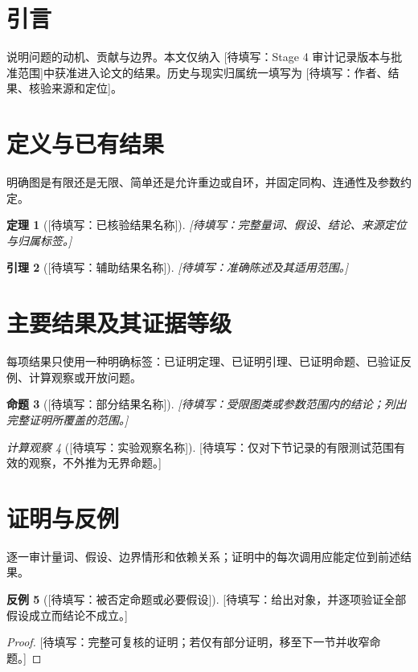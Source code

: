 \documentclass[UTF8,11pt,a4paper,fontset=fandol]{ctexart}
\title{\PaperTitle}
\author{\AuthorNames}
\date{\today}
\newtheorem{theorem}{定理}[section]
\newtheorem{lemma}[theorem]{引理}
\newtheorem{proposition}[theorem]{命题}
\theoremstyle{definition}
\newtheorem{counterexample}[theorem]{反例}
\theoremstyle{remark}
\newtheorem{observation}[theorem]{计算观察}
\newcommand{\Placeholder}[1]{\textcolor{magenta!70!black}{[待填写：#1]}}
\newcommand{\Attribution}[1]{\Placeholder{#1}}
\providecommand{\EvidenceAudit}{\Placeholder{Stage 4 审计记录版本与批准范围}}
\begin{document}
\maketitle
\begin{abstract}
\Placeholder{研究问题、图类、主要结果、证据等级与局限。不得把计算观察写成证明。}
\end{abstract}
\tableofcontents

\section{引言}
说明问题的动机、贡献与边界。本文仅纳入 \EvidenceAudit 中获准进入论文的结果。历史与现实归属统一填写为 \Attribution{作者、结果、核验来源和定位}。

\section{定义与已有结果}
明确图是有限还是无限、简单还是允许重边或自环，并固定同构、连通性及参数约定。
\begin{theorem}[\Placeholder{已核验结果名称}]
\Placeholder{完整量词、假设、结论、来源定位与归属标签。}
\end{theorem}
\begin{lemma}[\Placeholder{辅助结果名称}]
\Placeholder{准确陈述及其适用范围。}
\end{lemma}

\section{主要结果及其证据等级}
每项结果只使用一种明确标签：已证明定理、已证明引理、已证明命题、已验证反例、计算观察或开放问题。
\begin{proposition}[\Placeholder{部分结果名称}]
\Placeholder{受限图类或参数范围内的结论；列出完整证明所覆盖的范围。}
\end{proposition}
\begin{observation}[\Placeholder{实验观察名称}]
\Placeholder{仅对下节记录的有限测试范围有效的观察，不外推为无界命题。}
\end{observation}

\section{证明与反例}
逐一审计量词、假设、边界情形和依赖关系；证明中的每次调用应能定位到前述结果。
\begin{counterexample}[\Placeholder{被否定命题或必要假设}]
\Placeholder{给出对象，并逐项验证全部假设成立而结论不成立。}
\end{counterexample}
\begin{proof}
\Placeholder{完整可复核的证明；若仅有部分证明，移至下一节并收窄命题。}
\end{proof}
\end{document}
